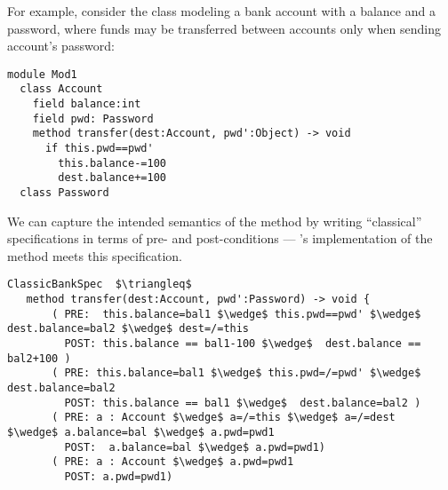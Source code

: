 


For example, consider the  class modeling a bank account
with a balance and a password, where funds may be transferred
between accounts only when sending account's password:

%
%

 
\begin{lstlisting}[language=Chainmail]
module Mod1
  class Account
    field balance:int 
    field pwd: Password
    method transfer(dest:Account, pwd':Object) -> void
      if this.pwd==pwd'
        this.balance-=100
        dest.balance+=100
  class Password
\end{lstlisting}

\noindent 
We can capture the intended
semantics of the  method by writing ``classical''
specifications in terms of pre- and post-conditions ---
's implementation of the  method meets
this specification.



\begin{lstlisting}[mathescape=true, frame=lines, language=Chainmail]
ClassicBankSpec  $\triangleq$
   method transfer(dest:Account, pwd':Password) -> void {
       ( PRE:  this.balance=bal1 $\wedge$ this.pwd==pwd' $\wedge$ dest.balance=bal2 $\wedge$ dest=/=this 
         POST: this.balance == bal1-100 $\wedge$  dest.balance == bal2+100 )
       ( PRE: this.balance=bal1 $\wedge$ this.pwd=/=pwd' $\wedge$ dest.balance=bal2
         POST: this.balance == bal1 $\wedge$  dest.balance=bal2 )
       ( PRE: a : Account $\wedge$ a=/=this $\wedge$ a=/=dest  $\wedge$ a.balance=bal $\wedge$ a.pwd=pwd1
         POST:  a.balance=bal $\wedge$ a.pwd=pwd1)
       ( PRE: a : Account $\wedge$ a.pwd=pwd1  
         POST: a.pwd=pwd1)       
\end{lstlisting}
 
